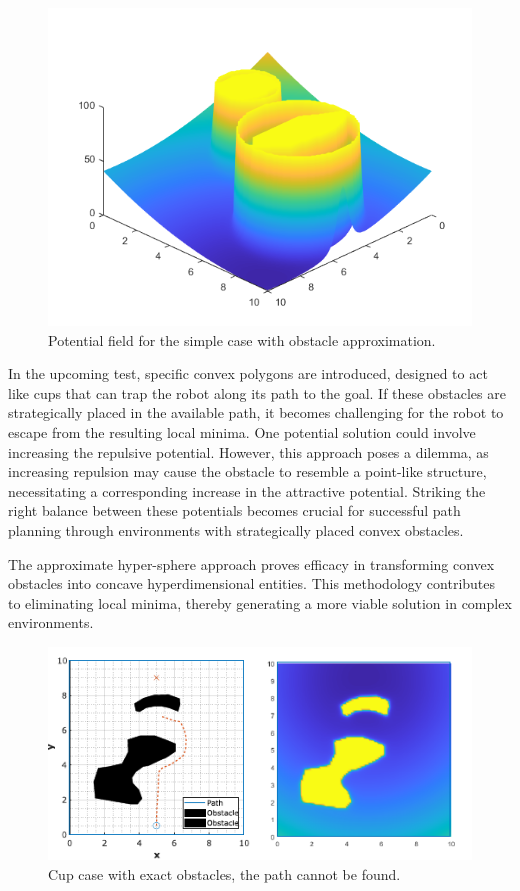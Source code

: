 \documentclass{IEEEtaes}
\begin{document}
{\begin{figure}
    \vspace{-1em}
    \begin{center}    
        \includegraphics[width=0.8\linewidth]{simple-approx-pot.png}
    \end{center}
     \caption{Potential field for the simple case with obstacle approximation.}
     \label{simple-approx-2}
\end{figure}

In the upcoming test, specific convex polygons are introduced, designed to act like cups that can trap the robot along its path to the goal. If these obstacles are strategically placed in the available path, it becomes challenging for the robot to escape from the resulting local minima. One potential solution could involve increasing the repulsive potential. However, this approach poses a dilemma, as increasing repulsion may cause the obstacle to resemble a point-like structure, necessitating a corresponding increase in the attractive potential. Striking the right balance between these potentials becomes crucial for successful path planning through environments with strategically placed convex obstacles.

The approximate hyper-sphere approach proves efficacy in transforming convex obstacles into concave hyperdimensional entities. This methodology contributes to eliminating local minima, thereby generating a more viable solution in complex environments.

\begin{figure}
    \vspace{-1em}
    \begin{center}    
        \includegraphics[width=0.8\linewidth]{simple-3.pdf}
    \end{center}
     \caption{Cup case with exact obstacles, the path cannot be found.}
     \label{three}
\end{figure}

}
\end{document}
